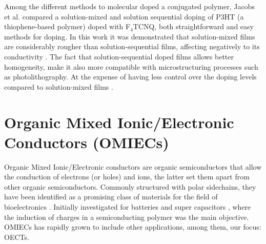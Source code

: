 Among the different methods to molecular doped a conjugated polymer, Jacobs et al. compared a solution-mixed and solution sequential doping of P3HT (a thiophene-based polymer) doped with F$_{4}$TCNQ, both straightforward and easy methods for doping. In this work it was demonstrated that solution-mixed films are considerably rougher than solution-sequential films, affecting negatively to its conductivity \cite{jacobsComparisonSolutionmixedSequentially2016}. The fact that solution-sequential doped films allows better homogeneity, make it also more compatible with microstructuring processes such as photolithography. At the expense of having less control over the doping levels compared to solution-mixed films \cite{tanOrganicMixedIonic2022}.




\section{Organic Mixed Ionic/Electronic Conductors (OMIECs)} \label{sec:omiecs}

Organic Mixed Ionic/Electronic conductors are organic semiconductors that allow the conduction of electrons (or holes) and ions, the latter set them apart from other organic semiconductors. %
Commonly structured with polar sidechains, they have been identified as a promising class of materials for the field of bioelectronics
\cite{giovannittiEnergeticControlRedoxActive2020}. Initially investigated for batteries and super capacitors \cite{snookConductingpolymerbasedSupercapacitorDevices2011}
\cite{liangOrganicElectrodeMaterials2012}, where the induction of charges in a semiconducting polymer was the main objective. OMIECs has rapidly grown to include other applications, among them, our focus: OECTs.\\

